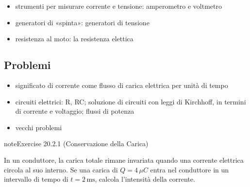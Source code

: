 \documentclass[letterpaper,10pt,italian]{jupyterBook}
\begin{document}
\sphinxAtStartPar
{}
\begin{itemize}
\item {} 
\sphinxAtStartPar
strumenti per misurare corrente e tensione: amperometro e voltmetro

\item {} 
\sphinxAtStartPar
generatori di «spinta»: generatori di tensione

\item {} 
\sphinxAtStartPar
resistenza al moto: la resistenza elettica

\end{itemize}

\sphinxstepscope


\subsection{Problemi}
\label{\detokenize{ch/electromagnetism/electric-current-problems:problemi}}\label{\detokenize{ch/electromagnetism/electric-current-problems:physics-hs-electromagnetism-electric-current-problems}}\label{\detokenize{ch/electromagnetism/electric-current-problems::doc}}\begin{itemize}
\item {} 
\sphinxAtStartPar
significato di corrente come flusso di carica elettrica per unità di tempo

\item {} 
\sphinxAtStartPar
circuiti elettrici: R, RC; soluzione di circuiti con leggi di Kirchhoff, in termini di corrente e voltaggio; flussi di potenza

\item {} 
\sphinxAtStartPar
vecchi problemi

\end{itemize}
 \label{exercise:ch/electromagnetism/electric-current-problems-exercise-0}

\begin{sphinxadmonition}{note}{Exercise 20.2.1 (Conservazione della Carica)}



\sphinxAtStartPar
In un conduttore, la carica totale rimane invariata quando una corrente elettrica circola al suo interno. Se una carica di \(Q = 4 \, \mu C\) entra nel conduttore in un intervallo di tempo di \(t = 2 \, \text{ms}\), calcola l’intensità della corrente.
\end{sphinxadmonition}
 \label{exercise:ch/electromagnetism/electric-current-problems-exercise-1}
\end{document}
